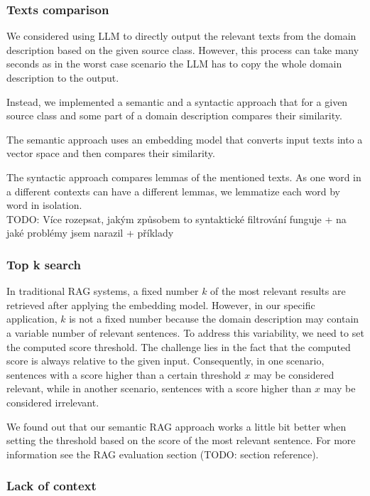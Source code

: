 \subsubsection{Texts comparison}
\label{texts_comparison}
  
We considered using LLM to directly output the relevant texts from the domain description based on the given source class. However, this process can take many seconds as in the worst case scenario the LLM has to copy the whole domain description to the output.

Instead, we implemented a semantic and a syntactic approach that for a given source class and some part of a domain description compares their similarity.
 
The semantic approach uses an embedding model that converts input texts into a vector space and then compares their similarity.

The syntactic approach compares lemmas of the mentioned texts. As one word in a different contexts can have a different lemmas, we lemmatize each word by word in isolation. \\

TODO: Více rozepsat, jakým způsobem to syntaktické filtrování funguje + na jaké problémy jsem narazil + příklady


\subsubsection{Top k search}

In traditional RAG systems, a fixed number $k$ of the most relevant results are retrieved after applying the embedding model. However, in our specific application, $k$ is not a fixed number because the domain description may contain a variable number of relevant sentences. To address this variability, we need to set the computed score threshold. The challenge lies in the fact that the computed score is always relative to the given input. Consequently, in one scenario, sentences with a score higher than a certain threshold $x$ may be considered relevant, while in another scenario, sentences with a score higher than $x$ may be considered irrelevant.

We found out that our semantic RAG approach works a little bit better when setting the threshold based on the score of the most relevant sentence. For more information see the RAG evaluation section (TODO: section reference).


\subsubsection{Lack of context}

